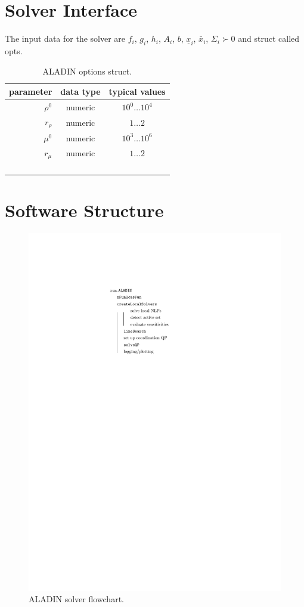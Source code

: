 \documentclass[]{scrartcl}
\begin{document}
\section{Solver Interface}
The input data for the solver are $f_i$, $g_i$, $h_i$, $A_i$, $b$, $\underline{x}_i$, $\bar x_i$, $\Sigma_i \succ 0$ and struct called opts.

\begin{table}
	\centering
	\begin{tabular}{rcc}
		\hline
parameter & data type & typical values \\ 
\hline
$\rho^0$	& numeric  & $10^0 \dots 10^4$ \\ 
	\hline 
$r_\rho$	& numeric  & $1 \dots 2$ \\ 
	\hline 
$\mu^0$	& numeric  & $10^3 \dots 10^6$ \\ 
	\hline 
$r_\mu$	& numeric  & $1 \dots 2$  \\ 
	\hline 
	&  &  \\ 
	\hline 
	&  &  \\ 
	\hline 
	&  &  \\ 
	\hline 
	&  &  \\ 
	\hline 
\end{tabular} 
\caption{ALADIN options struct.}
\end{table}

\section{Software Structure}
\begin{figure}
	\centering
	\includegraphics[width=0.3\linewidth]{figures/flowChart}
	\caption{ALADIN solver flowchart.}
	\label{fig:flowchart}
\end{figure}
\end{document}
